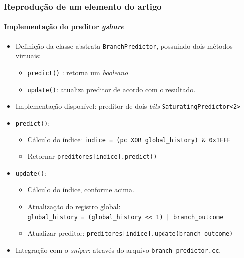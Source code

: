 \documentclass[10pt]{beamer}
\begin{document}
\begin{frame}
\frametitle{Reprodução de um elemento do artigo}
\framesubtitle{Implementação do preditor \textit{gshare}}

\begin{itemize}
  
  \item Definição da classe abstrata \texttt{BranchPredictor}, possuindo dois
  métodos virtuais:
  \begin{itemize} 
  \item \texttt{predict()} : retorna um \textit{booleano}
  \item \texttt{update()}: atualiza preditor de acordo com o resultado.
  \end{itemize}
 
 \item Implementação disponível: preditor de dois \textit{bits}
 \texttt{SaturatingPredictor<2>}
 
 \item \texttt{predict()}:
  \begin{itemize} 
  \item Cálculo do índice: \texttt{indice = (pc XOR global\_history) \& 0x1FFF}
  \item Retornar \texttt{preditores[indice].predict()}
  \end{itemize}
  
  \item \texttt{update()}:
  \begin{itemize} 
  \item Cálculo do índice, conforme acima.
  \item Atualização do registro global:\\ \texttt{global\_history =
  (global\_history << 1) | branch\_outcome}
  \item Atualizar preditor: \texttt{preditores[indice].update(branch\_outcome)}
  \end{itemize}
 
 \item Integração com o \textit{sniper}: através do arquivo
 \texttt{branch\_predictor.cc}.
 

\end{itemize}
\end{frame}
\end{document}

